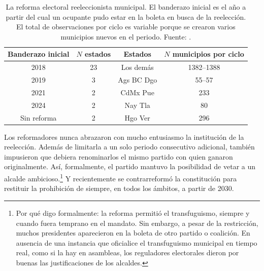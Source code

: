 \documentclass[letter,12pt]{article}
\begin{document}
\begin{table}
  \centering
  \begin{tabular}{cccc}
    Banderazo inicial  & $N$ estados & Estados    & $N$ municipios por ciclo \\ \hline
    2018            &          23 & Los demás  &               1382--1388 \\
    2019            &           3 & Ags BC Dgo &                   55--57 \\
    2021            &           2 & CdMx Pue   &                      233 \\
    2024            &           2 & Nay Tla    &                       80 \\
    Sin reforma     &           2 & Hgo Ver    &                      296 \\ \hline
  \end{tabular}
  \caption{La reforma electoral reeleccionista municipal. El banderazo inicial es el año a partir del cual un ocupante pudo estar en la boleta en busca de la reelección. El total de observaciones por ciclo es variable porque se crearon varios municipios nuevos en el periodo. Fuente: \citet{magar.el.dataset.2026}.}\label{T:reel}
\end{table}

Los reformadores nunca abrazaron con mucho entusiasmo la institución de la reelección. Además de limitarla a un solo periodo consecutivo adicional, también impusieron que debiera renominarlos el mismo partido con quien ganaron originalmente. Así, formalmente, el partido mantuvo la posibilidad de vetar a un alcalde ambicioso.\footnote{Por qué digo formalmente: la reforma permitió el transfuguismo, siempre y cuando fuera temprano en el mandato. Sin embargo, a pesar de la restricción, muchos presidentes aparecieron en la boleta de otro partido o coalición. En ausencia de una instancia que oficialice el transfuguismo municipal en tiempo real, como si la hay en asambleas, los reguladores electorales dieron por buenas las justificaciones de los alcaldes.} Y recientemente se contrarreformó la constitución para restituir la prohibición de siempre, en todos los ámbitos, a partir de 2030.
\end{document}
